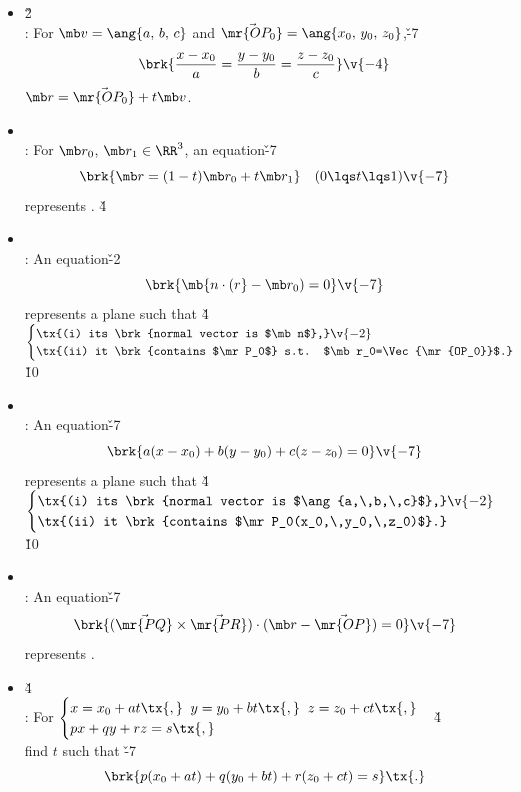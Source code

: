 \documentclass[dvipdfmx,a4paper,titlepage,9pt]{jsarticle}
\begin{document}
\begin{multicols*}{2}
\begin{itemize}[label={-}]
\item{}\v2\\
: For $\mb v=\ang{a,\,b,\,c}$ and $\Vec{\mr{OP_0}}=\ang{x_0,\,y_0,\,z_0}$,\v{-7}\\
$$\brk{\frac{x-x_0}a=\frac{y-y_0}b=\frac{z-z_0}c}\v{-4}$$
\;\; $\mb r=\Vec{\mr{OP_0}}+t\mb v$. \\

\item{}\\
: For $\mb r_0$, $\mb r_1\in\RR^3$, an equation\v{-7}
$$\brk{\mb r=(1-t)\mb r_0+t\mb r_1}\quad(0\lqs t\lqs1)\v{-7}$$
\;\;represents . \v4\\

\item{} \\
: An equation\v{-2}
$$\brk{\mb{n\cdot(r}-\mb r_0)=0}\v{-7}$$
\;\;represents a plane such that \v4\\
\;\;$\begin{cases}\tx{(i) its \brk{normal vector is $\mb n$},}\v{-2} \\
                  \tx{(ii) it \brk{contains $\mr P_0$} s.t. $\mb r_0=\Vec{\mr{OP_0}}$.}\end{cases}$ \v{10}\\
                  
\item{} \\
: An equation\v{-7}
$$\brk{a(x-x_0)+b(y-y_0)+c(z-z_0)=0}\v{-7}$$
\;\;represents a plane such that \v4\\
\;\;$\begin{cases}\tx{(i) its \brk{normal vector is $\ang{a,\,b,\,c}$},}\v{-2} \\
                  \tx{(ii) it \brk{contains $\mr P_0(x_0,\,y_0,\,z_0)$}.}\end{cases}$ \v{10}\\

\item{} \\
: An equation\v{-7}
$$\brk{{(\Vec{\mr{PQ}}\times\Vec{\mr{PR}})\cdot(\mb r-\Vec{\mr{OP}})=0}}\v{-7}$$
represents .

\vfill\null\columnbreak

\item{} \v4\\
: For $\begin{cases}x=x_0+at\tx{,}\;\;y=y_0+bt\tx{,}\;\;z=z_0+ct\tx{,}\\
                    px+qy+rz=s\tx{,}\end{cases}$\v4\\
\;\;find $t$ such that \v{-7}
$$\brk{p(x_0+at)+q(y_0+bt)+r(z_0+ct)=s}\tx{.}$$


\end{itemize}
\end{multicols*}
\end{document}
